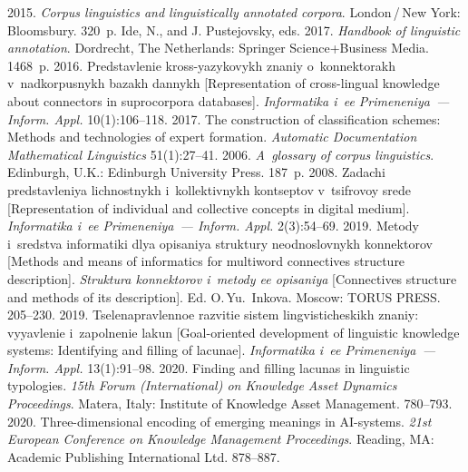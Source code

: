 \begin{multicols}{2}
{{\begin{thebibliography}{99}
 2015. \textit{Corpus linguistics and 
linguistically annotated corpora}. London\,/\,New York: Bloomsbury. 320~p.
Ide, N., and J. Pustejovsky, eds. 2017. \textit{Handbook of linguistic annotation}. Dordrecht, 
The Netherlands: Springer Science\;+\;Business Media. 1468~p.
 2016. 
Predstavlenie kross-yazykovykh znaniy o~konnektorakh v~nadkorpusnykh bazakh dannykh 
[Representation of cross-lingual knowledge about connectors in suprocorpora databases]. 
\textit{Informatika i~ee Primeneniya~--- Inform. Appl.} 10(1):106--118.
 2017. The construction of classification schemes: 
Methods and technologies of expert formation. \textit{Automatic Documentation Mathematical Linguistics} 
51(1):27--41.
 2006. \textit{A~glossary of corpus linguistics}. 
Edinburgh, U.K.: Edinburgh University Press. 187~p.
 2008. Zadachi predstavleniya 
lichnostnykh i~kollektivnykh kontseptov v~tsifrovoy srede [Representation of individual and 
collective concepts in digital medium]. \textit{Informatika i~ee Primeneniya~--- Inform. Appl.} 
2(3):54--69.
 2019. Metody i~sredstva informatiki dlya 
opisaniya struktury neodnoslovnykh konnektorov [Methods and means of informatics for 
multiword connectives structure description]. \textit{Struktura konnektorov i~metody ee 
opisaniya} [Connectives structure and methods of its description]. Ed. O.\,Yu.~Inkova. Moscow: 
TORUS PRESS. 205--230.
 2019. Tselenapravlennoe razvitie sistem lingvisticheskikh znaniy: 
vyyavlenie i~zapolnenie lakun [Goal-oriented development of linguistic knowledge systems: 
Identifying and filling of lacunae]. \textit{Informatika i~ee Primeneniya~--- Inform. Appl.} 
13(1):91--98.
 2020. Finding and filling lacunas in linguistic typologies. \textit{15th Forum 
(International) on Knowledge Asset Dynamics Proceedings}. Matera, Italy: Institute of Knowledge 
Asset Management. 780--793.
 2020. Three-dimensional encoding of emerging meanings in AI-systems. 
\textit{21st European Conference on Knowledge Management Proceedings}. Reading, MA: 
Academic Publishing International Ltd. 878--887.

\end{thebibliography}}}
\end{multicols}
